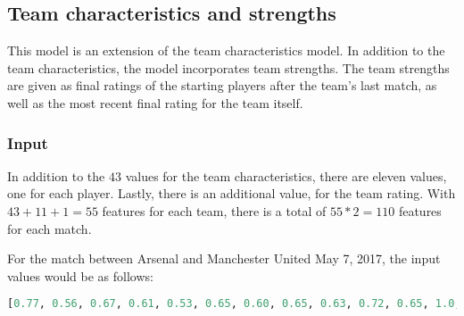 \subsection{Team characteristics and strengths}

This model is an extension of the team characteristics model. In addition to the team characteristics, the model incorporates team strengths. The team strengths are given as final ratings of the starting players after the team's last match, as well as the most recent final rating for the team itself.

\subsubsection{Input}

In addition to the $43$ values for the team characteristics, there are eleven values, one for each player. Lastly, there is an additional value, for the team rating. With $43 + 11 + 1 = 55$ features for each team, there is a total of $55 * 2 = 110$ features for each match.

For the match between Arsenal and Manchester United May 7, 2017, the input values would be as follows:
\begin{lstlisting}[language=Python]
    [0.77, 0.56, 0.67, 0.61, 0.53, 0.65, 0.60, 0.65, 0.63, 0.72, 0.65, 1.0, 1.0, 1.0, 1.0, 0.0, 1.0, 0.0, 0.0, 0.0, 0.0, 0.0, 0.55, 0.55, 0.45, 0.45, 0.0, 0.0, 0.0, 0.25, 0.0, 0.0, 0.0, 0.0, 0.0, 0.0, 0.0, 0.0, 0.0, 0.0, 0.0, 0.15, 0.0, 0.0, 0.0, 0.0, 0.45, 0.0, 0.0, 0.0, 0.45, 1.0, 0.0, 1.0, 0.0, 0.63, 0.70, 0.72, 0.71, 0.68, 0.72, 0.69, 0.75, 0.82, 0.68, 0.78, 0.71, 1.0, 1.0, 1.0, 0.0, 0.0, 0.0, 1.0, 0.0, 0.0, 1.0, 0.0, 0.25, 0.0, 0.45, 0.0, 0.45, 0.55, 0.45, 0.15, 0.0, 0.0, 0.45, 0.0, 0.0, 0.0, 0.0, 0.0, 0.0, 0.0, 0.0, 0.0, 0.0, 0.0, 0.0, 0.0, 0.55, 0.0, 0.0, 1.0, 0.55, 0.0, 1.0, 1.0, 0.0, 0.70]
\end{lstlisting}